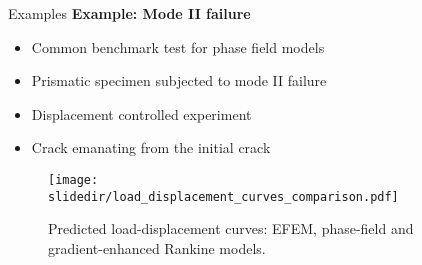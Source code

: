 
\begin{frame}{Examples}
    \textbf{Example: Mode II failure}
\begin{minipage}{1.0\textwidth}
\begin{minipage}{0.5\textwidth}
    \begin{itemize}
        \item Common benchmark test for phase field models
        \item Prismatic specimen subjected to mode II failure
        \item Displacement controlled experiment
        \item Crack emanating from the initial crack 
    \end{itemize}
\end{minipage}%
\end{minipage}

\begin{minipage}{1.0\textwidth}
    \begin{figure}[htpb]
        \centering
        \texttt{[image: \\slidedir/load\_displacement\_curves\_comparison.pdf]}
        \caption{Predicted load-displacement curves: EFEM, phase-field and gradient-enhanced Rankine models.}%
    \end{figure}
\end{minipage}
\end{frame}
